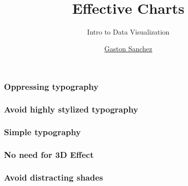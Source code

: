 \documentclass[12pt]{beamer}\usepackage[]{graphicx}\usepackage[]{color}
\title{Effective Charts}
\subtitle{Intro to Data Visualization}
\author{\href{http://www.gastonsanchez.com}{Gaston Sanchez}}
\institute{\href{https://creativecommons.org/licenses/by-sa/4.0/}{\tt \scriptsize \color{foreground} CC BY-SA 4.0}}
\date{}
\begin{document}
{
  \frame{\titlepage} 
}


\begin{frame}
\begin{center}
\Huge{}
\end{center}
\end{frame}


\begin{frame}
\frametitle{Oppressing typography}
\begin{center}
\end{center}
\end{frame}


\begin{frame}
\frametitle{Avoid highly stylized typography}
\begin{center}
\end{center}
\end{frame}


\begin{frame}
\frametitle{Simple typography}
\begin{center}
\end{center}
\end{frame}


\begin{frame}
\frametitle{No need for 3D Effect}
\begin{center}
\end{center}
\end{frame}


\begin{frame}
\frametitle{Avoid distracting shades}
\begin{center}
\end{center}
\end{frame}
\end{document}
